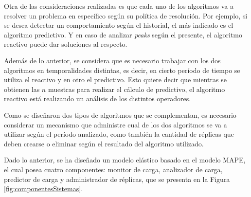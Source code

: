 
\normalsize{Otra de las consideraciones realizadas es que cada uno de los algoritmos va a resolver un problema en espec\'ifico seg\'un su pol\'itica de resoluci\'on. Por ejemplo, si se desea detectar un comportamiento seg\'un el historial, el m\'as indicado es el algoritmo predictivo. Y en caso de analizar \textit{peaks} seg\'un el presente, el algoritmo reactivo puede dar soluciones al respecto.}

Adem\'as de lo anterior, se considera que es necesario trabajar con los dos algoritmos en temporalidades distintas, es decir, en cierto per\'iodo de tiempo se utiliza el reactivo y en otro el predictivo. Esto quiere decir que mientras se obtienen las $n$ muestras para realizar el c\'alculo de predictivo, el algoritmo reactivo est\'a realizando un an\'alisis de los distintos operadores.


Como se dise\~naron dos tipos de algoritmos que se complementan, es necesario considerar un mecanismo que administre cual de los dos algoritmos se va a utilizar seg\'un el per\'iodo analizado, como tambi\'en la cantidad de r\'eplicas que deben crearse o eliminar seg\'un el resultado del algoritmo utilizado.

Dado lo anterior, se ha dise\~nado un modelo el\'astico \normalsize{basado en el modelo MAPE}\citep{redbooks2004practical}\normalsize{, el cual posea cuatro componentes}: monitor de carga, analizador de carga, predictor de carga y administrador de r\'eplicas, que se presenta en la Figura \ref{fig:componentesSistemas}.

